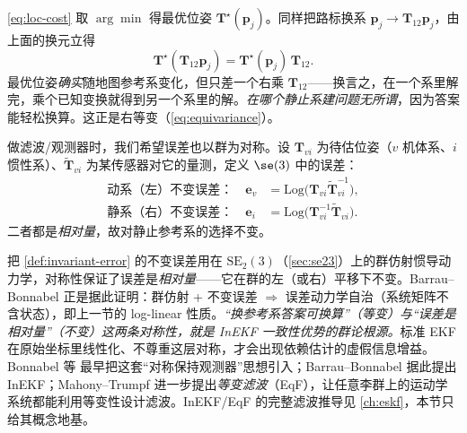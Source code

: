 \begin{example}[最优位姿是等变量]
\cref{eq:loc-cost} 取 $\arg\min$ 得最优位姿 $\mathbf{T}^\star(\mathbf{p}_j)$。同样把路标换系 $\mathbf{p}_j\to\mathbf{T}_{12}\mathbf{p}_j$，由上面的换元立得
\begin{equation}
  \mathbf{T}^\star(\mathbf{T}_{12}\mathbf{p}_j)=\mathbf{T}^\star(\mathbf{p}_j)\,\mathbf{T}_{12}.
  \label{eq:opt-pose-equivariant}
\end{equation}
最优位姿\emph{确实}随地图参考系变化，但只差一个右乘 $\mathbf{T}_{12}$——换言之，在一个系里解完，乘个已知变换就得到另一个系里的解。\emph{在哪个静止系建问题无所谓}，因为答案能轻松换算。这正是右等变（\cref{eq:equivariance}）。
\end{example}

\begin{definition}[不变误差]\label{def:invariant-error}
做滤波/观测器时，我们希望误差也以群为对称。设 $\mathbf{T}_{vi}$ 为待估位姿（$v$ 机体系、$i$ 惯性系）、$\tilde{\mathbf{T}}_{vi}$ 为某传感器对它的量测，定义 $\se(3)$ 中的误差：
\begin{align}
  \text{动系（左）不变误差：}\quad \mathbf{e}_v&=\mathrm{Log}\big(\mathbf{T}_{vi}\tilde{\mathbf{T}}_{vi}^{-1}\big),\label{eq:inv-err-moving}\\
  \text{静系（右）不变误差：}\quad \mathbf{e}_i&=\mathrm{Log}\big(\mathbf{T}_{vi}^{-1}\tilde{\mathbf{T}}_{vi}\big).\label{eq:inv-err-stationary}
\end{align}
二者都是\emph{相对量}，故对静止参考系的选择不变。
\end{definition}

\begin{insight}
把 \cref{def:invariant-error} 的不变误差用在 $\mathrm{SE}_2(3)$（\cref{sec:se23}）上的群仿射惯导动力学，对称性保证了误差是\emph{相对量}——它在群的左（或右）平移下不变。Barrau--Bonnabel\cite{barrau2017invariant} 正是据此证明：群仿射 + 不变误差 $\Rightarrow$ 误差动力学自治（系统矩阵不含状态），即上一节的 log-linear 性质。\emph{“换参考系答案可换算”（等变）与“误差是相对量”（不变）这两条对称性，就是 InEKF 一致性优势的群论根源。}标准 EKF 在原始坐标里线性化、不尊重这层对称，才会出现依赖估计的虚假信息增益。Bonnabel 等\cite{bonnabel2008symmetry} 最早把这套“对称保持观测器”思想引入；Barrau--Bonnabel\cite{barrau2017invariant} 据此提出 InEKF；Mahony--Trumpf\cite{mahony2021equivariant} 进一步提出\emph{等变滤波}（EqF），让任意李群上的运动学系统都能利用等变性设计滤波。InEKF/EqF 的完整滤波推导见 \cref{ch:eskf}，本节只给其概念地基。
\end{insight}

